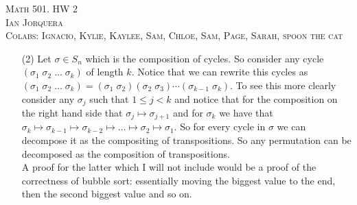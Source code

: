 \documentclass[12pt]{amsart}
\theoremstyle{definition}
\begin{document}
\begin{center}
    \textsc{Math 501. HW 2\\ Ian Jorquera\\ Colabs: Ignacio, Kylie, Kaylee, Sam, Chloe, Sam, Page, Sarah, spoon the cat}
\end{center}
\vspace{1em}


\begin{itemize}

\item[(2)] %
Let $\sigma\in S_n$ which is the composition of cycles. So consider any cycle $(\sigma_1\;\sigma_2\;\dots\;\sigma_k)$ of length $k$. Notice that we can rewrite this cycles as $(\sigma_1\;\sigma_2\;\dots\;\sigma_k)=(\sigma_1\;\sigma_2)(\sigma_2\;\sigma_3)\cdots(\sigma_{k-1}\;\sigma_k)$. To see this more clearly consider any $\sigma_j$ such that $1\leq j< k$ and notice that for the composition on the right hand side that $\sigma_j\mapsto \sigma_{j+1}$ and for $\sigma_k$ we have that $\sigma_k\mapsto\sigma_{k-1}\mapsto\sigma_{k-2}\mapsto\dots\mapsto \sigma_{2}\mapsto \sigma_1$. So for every cycle in $\sigma$ we can decompose it as the compositing of transpositions. So any permutation can be decomposed as the composition of transpositions.\\

\noindent A proof for the latter which I will not include would be a proof of the correctness of bubble sort: essentially moving the biggest value to the end, then the second biggest value and so on.\\


\end{itemize}
\end{document}
